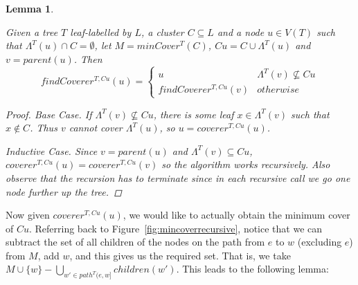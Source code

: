 \documentclass{article}
\newcommand{\leafset}{\Lambda}
\newtheorem{findcovererrecursive}[incompatibility]{Lemma}
\begin{document}
    \begin{findcovererrecursive}
        \label{lem:findcovererrecursive}

        Given a tree $T$ leaf-labelled by $L$, a cluster $C \subseteq L$ and a node $u \in V(T)$ such that $\leafset^{T}(u) \cap C = \emptyset$, let $M = minCover^{T}(C)$, $Cu = C \cup \leafset^{T}(u)$ and $v = parent(u)$. Then
        \[findCoverer^{T, Cu}(u) = \begin{cases}
            u & \leafset^{T}(v) \not\subseteq Cu\\
            findCoverer^{T, Cu}(v) & otherwise
        \end{cases}\]

        \begin{proof}
            \textit{Base Case.} If $\leafset^{T}(v) \not\subseteq Cu$, there is some leaf $x \in \leafset^{T}(v)$ such that $x \not\in C$. Thus $v$ cannot cover $\leafset^{T}(u)$, so $u = coverer^{T, Cu}(u)$.

            \textit{Inductive Case.} Since $v = parent(u)$ and $\leafset^{T}(v) \subseteq Cu$, $coverer^{T, Cu}(u) = coverer^{T, Cu}(v)$ so the algorithm works recursively. Also observe that the recursion has to terminate since in each recursive call we go one node further up the tree.
        \end{proof}
    \end{findcovererrecursive}

    Now given $coverer^{T, Cu}(u)$, we would like to actually obtain the minimum cover of $Cu$. Referring back to Figure~\ref{fig:mincoverrecursive}, notice that we can subtract the set of all children of the nodes on the path from $e$ to $w$ (excluding $e$) from $M$, add $w$, and this gives us the required set. That is, we take $M \cup \{w\} - \bigcup_{w' \in path^{T}(e, w]} children(w')$. This leads to the following lemma:
    \newline
\end{document}

